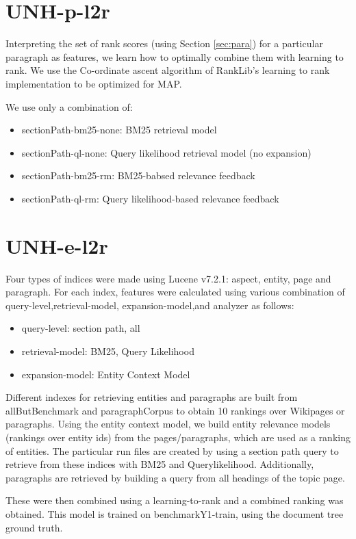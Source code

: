 \documentclass{article}
\begin{document}
\section{UNH-p-l2r}

Interpreting the set of rank scores (using Section \ref{sec:para}) for a particular paragraph as features, we learn how to optimally combine them with learning to rank. We use the Co-ordinate ascent algorithm of RankLib's learning to rank implementation to be optimized for MAP.

We use only a combination of:
\begin{itemize}
    \item sectionPath-bm25-none: BM25 retrieval model
    \item sectionPath-ql-none: Query likelihood retrieval model (no expansion)
    \item sectionPath-bm25-rm: BM25-babsed relevance feedback
    \item sectionPath-ql-rm: Query likelihood-based relevance feedback
\end{itemize}



\section{UNH-e-l2r}


Four types of indices were made using Lucene v7.2.1: aspect, entity, page and paragraph. For each index, features were calculated using various combination of query-level,retrieval-model, expansion-model,and analyzer as follows:
\begin{itemize}
   \item query-level: section path, all
    \item retrieval-model: BM25, Query Likelihood
    \item expansion-model: Entity Context Model
\end{itemize}
Different indexes for retrieving entities and paragraphs are built from allButBenchmark and paragraphCorpus to obtain 10 rankings over Wikipages or paragraphs. Using the entity context model, we build entity relevance models (rankings over entity ids) from the pages/paragraphs, which are used as a ranking of entities. The particular run files are created by using a section path query to retrieve from these indices with BM25 and Querylikelihood. Additionally, paragraphs are retrieved by building a query from all headings of the topic page.

These were then combined using a learning-to-rank and a combined ranking was obtained. 
This model is trained on benchmarkY1-train, using the document tree ground truth.
\end{document}
